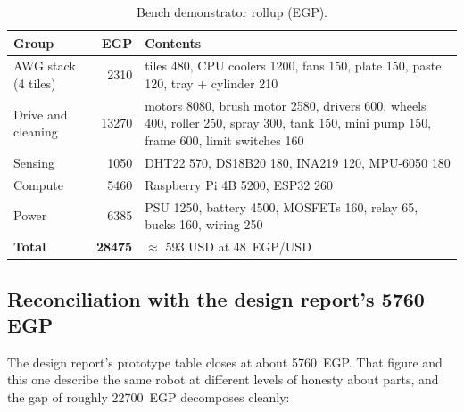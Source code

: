 \documentclass[11pt,a4paper]{article}
\begin{document}
\begin{table}[h]
\centering
\caption{Bench demonstrator rollup (EGP).}
\label{tab:bench}
\begin{tabular}{@{}lrp{9.6cm}@{}}
\toprule
\textbf{Group} & \textbf{EGP} & \textbf{Contents}\\
\midrule
AWG stack (4 tiles) & \num{2310} & tiles 480, CPU coolers 1200, fans 150,
  plate 150, paste 120, tray + cylinder 210\\
Drive and cleaning & \num{13270} & motors 8080, brush motor 2580,
  drivers 600, wheels 400, roller 250, spray 300, tank 150, mini pump 150,
  frame 600, limit switches 160\\
Sensing & \num{1050} & DHT22 570, DS18B20 180, INA219 120, MPU-6050 180\\
Compute & \num{5460} & Raspberry Pi 4B 5200, ESP32 260\\
Power & \num{6385} & PSU 1250, battery 4500, MOSFETs 160, relay 65,
  bucks 160, wiring 250\\
\midrule
\textbf{Total} & \textbf{\num{28475}} & $\approx$ \num{593} USD at
  \num{48}~EGP/USD\\
\bottomrule
\end{tabular}
\end{table}

\subsection{Reconciliation with the design report's 5760 EGP}
The design report's prototype table closes at about \num{5760}~EGP. That
figure and this one describe the same robot at different levels of honesty
about parts, and the gap of roughly \num{22700}~EGP decomposes cleanly:
\end{document}
